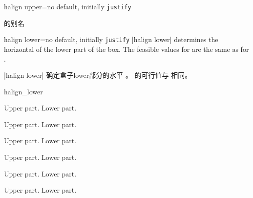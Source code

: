 \begin{docTcbKey}[][doc new=2015-05-07]{halign upper}{=}{no default, initially \texttt{justify}}

 的别名
\end{docTcbKey}



\begin{docTcbKey}[][doc new=2015-05-07]{halign lower}{=}{no default, initially \texttt{justify}}
|halign lower| determines the horizontal  of the lower part of the box.
The feasible values for  are the same as for .


|halign lower| 确定盒子lower部分的水平 。  的可行值与  相同。
\begin{exdispExample}{halign_lower}
\begin{tcbraster}[raster columns=3,fonttitle=\bfseries,
colback=red!5!white,colframe=red!75!black]

\begin{tcolorbox}[adjusted title=flush center,halign lower=flush center]
Upper part. \tcblower Lower part.
\end{tcolorbox}
\begin{tcolorbox}[adjusted title=flush left,halign lower=flush left]
Upper part. \tcblower Lower part.
\end{tcolorbox}
\begin{tcolorbox}[adjusted title=flush right,halign lower=flush right]
Upper part. \tcblower Lower part.
\end{tcolorbox}
\begin{tcolorbox}[adjusted title=center,halign lower=center]
Upper part. \tcblower Lower part.
\end{tcolorbox}
\begin{tcolorbox}[adjusted title=left,halign lower=left]
Upper part. \tcblower Lower part.
\end{tcolorbox}
\begin{tcolorbox}[adjusted title=right,halign lower=right]
Upper part. \tcblower Lower part.
\end{tcolorbox}

\end{tcbraster}
\end{exdispExample}
\end{docTcbKey}






